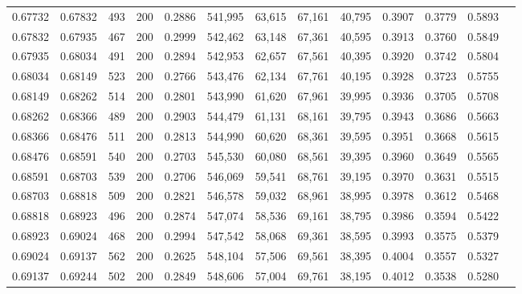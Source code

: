 \begin{tabular}{rrrrrrrrrrrrr}
0.67732 & 0.67832 &    493 & 200 &                                     0.2886 & 541,995 &  63,615 &  67,161 &  40,795 & 0.3907 & 0.3779 & 0.5893 \\
0.67832 & 0.67935 &    467 & 200 &                                     0.2999 & 542,462 &  63,148 &  67,361 &  40,595 & 0.3913 & 0.3760 & 0.5849 \\
0.67935 & 0.68034 &    491 & 200 &                                     0.2894 & 542,953 &  62,657 &  67,561 &  40,395 & 0.3920 & 0.3742 & 0.5804 \\
0.68034 & 0.68149 &    523 & 200 &                                     0.2766 & 543,476 &  62,134 &  67,761 &  40,195 & 0.3928 & 0.3723 & 0.5755 \\
0.68149 & 0.68262 &    514 & 200 &                                     0.2801 & 543,990 &  61,620 &  67,961 &  39,995 & 0.3936 & 0.3705 & 0.5708 \\
0.68262 & 0.68366 &    489 & 200 &                                     0.2903 & 544,479 &  61,131 &  68,161 &  39,795 & 0.3943 & 0.3686 & 0.5663 \\
0.68366 & 0.68476 &    511 & 200 &                                     0.2813 & 544,990 &  60,620 &  68,361 &  39,595 & 0.3951 & 0.3668 & 0.5615 \\
0.68476 & 0.68591 &    540 & 200 &                                     0.2703 & 545,530 &  60,080 &  68,561 &  39,395 & 0.3960 & 0.3649 & 0.5565 \\
0.68591 & 0.68703 &    539 & 200 &                                     0.2706 & 546,069 &  59,541 &  68,761 &  39,195 & 0.3970 & 0.3631 & 0.5515 \\
0.68703 & 0.68818 &    509 & 200 &                                     0.2821 & 546,578 &  59,032 &  68,961 &  38,995 & 0.3978 & 0.3612 & 0.5468 \\
0.68818 & 0.68923 &    496 & 200 &                                     0.2874 & 547,074 &  58,536 &  69,161 &  38,795 & 0.3986 & 0.3594 & 0.5422 \\
0.68923 & 0.69024 &    468 & 200 &                                     0.2994 & 547,542 &  58,068 &  69,361 &  38,595 & 0.3993 & 0.3575 & 0.5379 \\
0.69024 & 0.69137 &    562 & 200 &                                     0.2625 & 548,104 &  57,506 &  69,561 &  38,395 & 0.4004 & 0.3557 & 0.5327 \\
0.69137 & 0.69244 &    502 & 200 &                                     0.2849 & 548,606 &  57,004 &  69,761 &  38,195 & 0.4012 & 0.3538 & 0.5280 \\

\end{tabular}
